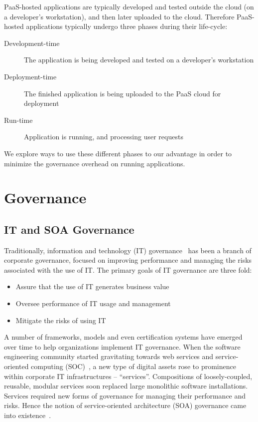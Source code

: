 PaaS-hosted applications are typically developed and tested outside the cloud (on a developer's workstation), 
and then later uploaded to the cloud. Therefore PaaS-hosted applications typically undergo three phases 
during their life-cycle:
\begin{description}
\item[Development-time] The application is being developed and tested on a developer's workstation
\item[Deployment-time] The finished application is being uploaded to the PaaS cloud for deployment
\item[Run-time] Application is running, and processing user requests
\end{description}
We explore ways to use these different phases to our advantage in order to minimize the governance
overhead on running applications. 

\section{Governance}
\subsection{IT and SOA Governance}
Traditionally, information and technology (IT) governance~\cite{brown2005framing} has been a branch of 
corporate governance, focused on
improving performance and managing the risks associated with the use of IT. The primary
goals of IT governance are three fold:

\begin{itemize}
\item Assure that the use of IT generates business value
\item Oversee performance of IT usage and management
\item Mitigate the risks of using IT
\end{itemize}

A number of frameworks, models and even certification systems have emerged over time to help organizations 
implement IT governance. When the software engineering community started gravitating towards web services and
service-oriented computing (SOC)~\cite{1254461, what-is-soa, Haines:2010:SAM:1787234.1787269}, 
a new type of digital assets rose to prominence within corporate IT 
infrastructures -- ``services''. Compositions of loosely-coupled, reusable, modular services soon replaced 
large monolithic software
installations. Services required new forms of governance for managing their performance
and risks. Hence the notion of service-oriented architecture (SOA) governance came into existence~\cite{gartner-soa-gov,soagov}. 

